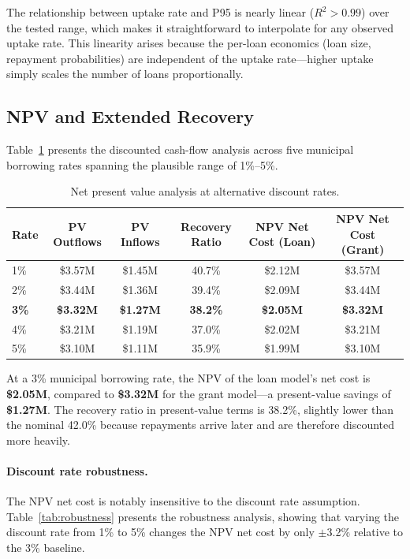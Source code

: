 \documentclass[11pt, letterpaper]{article}
\begin{document}
The relationship between uptake rate and P95 is nearly linear ($R^2 > 0.99$) over the tested range, which makes it straightforward to interpolate for any observed uptake rate. This linearity arises because the per-loan economics (loan size, repayment probabilities) are independent of the uptake rate---higher uptake simply scales the number of loans proportionally.

\subsection{NPV and Extended Recovery}

Table~\ref{tab:npv} presents the discounted cash-flow analysis across five municipal borrowing rates spanning the plausible range of 1\%--5\%.

\begin{table}[H]
  \centering
  \caption{Net present value analysis at alternative discount rates.}
  \label{tab:npv}
  \begin{tabular}{@{}lccccc@{}}
    \toprule
    \textbf{Rate} & \textbf{PV Outflows} & \textbf{PV Inflows} & \textbf{Recovery Ratio} & \textbf{NPV Net Cost (Loan)} & \textbf{NPV Net Cost (Grant)} \\
    \midrule
    1\% & \$3.57M & \$1.45M & 40.7\% & \$2.12M & \$3.57M \\
    2\% & \$3.44M & \$1.36M & 39.4\% & \$2.09M & \$3.44M \\
    \textbf{3\%} & \textbf{\$3.32M} & \textbf{\$1.27M} & \textbf{38.2\%} & \textbf{\$2.05M} & \textbf{\$3.32M} \\
    4\% & \$3.21M & \$1.19M & 37.0\% & \$2.02M & \$3.21M \\
    5\% & \$3.10M & \$1.11M & 35.9\% & \$1.99M & \$3.10M \\
    \bottomrule
  \end{tabular}
\end{table}

At a 3\% municipal borrowing rate, the NPV of the loan model's net cost is \textbf{\$2.05M}, compared to \textbf{\$3.32M} for the grant model---a present-value savings of \textbf{\$1.27M}. The recovery ratio in present-value terms is 38.2\%, slightly lower than the nominal 42.0\% because repayments arrive later and are therefore discounted more heavily.

\paragraph{Discount rate robustness.} The NPV net cost is notably insensitive to the discount rate assumption. Table~\ref{tab:robustness} presents the robustness analysis, showing that varying the discount rate from 1\% to 5\% changes the NPV net cost by only ${\pm}$3.2\% relative to the 3\% baseline.
\end{document}
